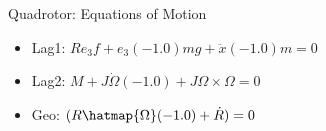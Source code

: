 Quadrotor: Equations of Motion
\begin{itemize}
\item Lag1: $R e_3 f+e_3 (-1.0) m g+\ddot{x} (-1.0) m = 0$
\item Lag2: $M+J \dot{\Omega } (-1.0)+J \Omega \times \Omega  = 0$
\item Geo: $(R \hatmap{\Omega } (-1.0)+\dot{R}) = 0$
\end{itemize}